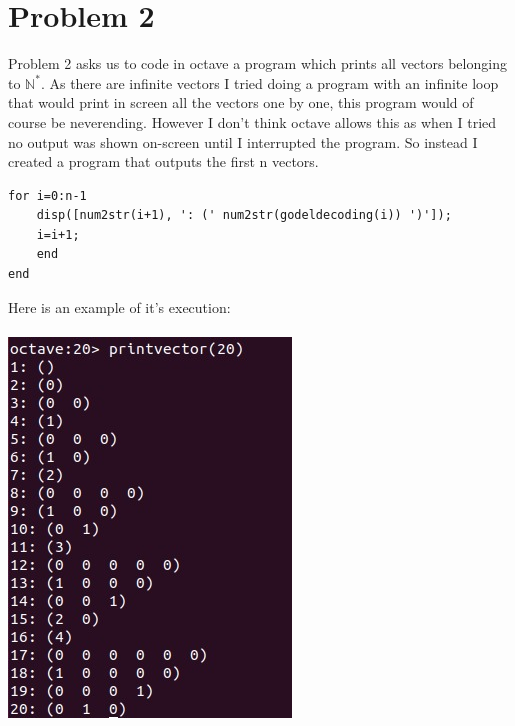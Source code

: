 \documentclass{article}
\begin{document}
\section*{Problem 2}
Problem 2 asks us to code in octave a program which prints all vectors belonging to $\mathbb{N}^*$. As there are infinite vectors I tried doing a program with an infinite loop that would print in screen all the vectors one by one, this program would of course be neverending. However I don't think octave allows this as when I tried no output was shown on-screen until I interrupted the program. So instead I created a program that outputs the first n vectors. 
\begin{lstlisting}
for i=0:n-1
	disp([num2str(i+1), ': (' num2str(godeldecoding(i)) ')']);
	i=i+1;
	end
end
\end{lstlisting} 
Here is an example of it's execution: \\\\ \includegraphics[width=\linewidth]{printvector.png}
\end{document}
